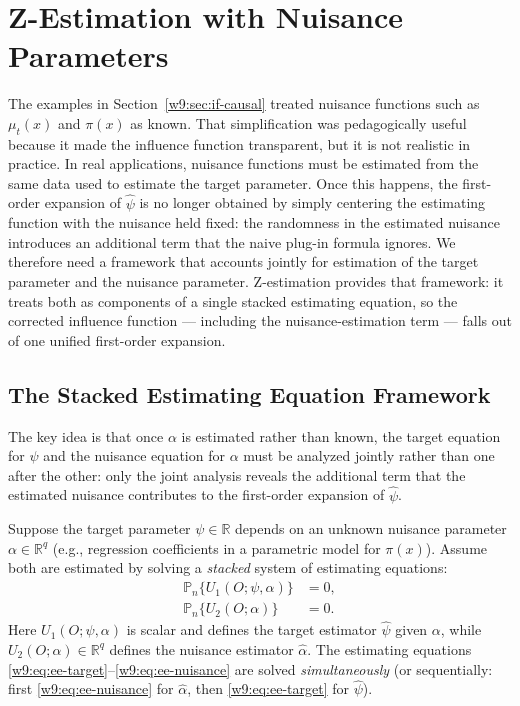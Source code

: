 \documentclass[master.tex]{subfiles}
\begin{document}
\section{Z-Estimation with Nuisance Parameters}
\label{w9:sec:nuisance}

The examples in Section~\ref{w9:sec:if-causal} treated nuisance
functions such as $\mu_t(x)$ and $\pi(x)$ as known.  That
simplification was pedagogically useful because it made the influence
function transparent, but it is not realistic in practice.  In real
applications, nuisance functions must be estimated from the same data
used to estimate the target parameter.  Once this happens, the
first-order expansion of $\hat\psi$ is no longer obtained by simply
centering the estimating function with the nuisance held fixed: the
randomness in the estimated nuisance introduces an additional term that
the naive plug-in formula ignores.  We therefore need a framework that
accounts jointly for estimation of the target parameter and the nuisance
parameter.  Z-estimation provides that framework: it treats both as
components of a single stacked estimating equation, so the corrected
influence function --- including the nuisance-estimation term --- falls
out of one unified first-order expansion.

\subsection{The Stacked Estimating Equation Framework}
\label{w9:subsec:stacked}

The key idea is that once $\alpha$ is estimated rather than known, the
target equation for $\psi$ and the nuisance equation for $\alpha$ must
be analyzed jointly rather than one after the other: only the joint
analysis reveals the additional term that the estimated nuisance
contributes to the first-order expansion of $\hat\psi$.

Suppose the target parameter $\psi \in \mathbb{R}$ depends on an
unknown nuisance parameter $\alpha \in \mathbb{R}^q$ (e.g., regression
coefficients in a parametric model for $\pi(x)$).  Assume both are
estimated by solving a \emph{stacked} system of estimating equations:
\begin{align}
  \mathbb{P}_n\bigl\{U_1(O;\psi,\alpha)\bigr\} &= 0,
  \label{w9:eq:ee-target}\\
  \mathbb{P}_n\bigl\{U_2(O;\alpha)\bigr\} &= 0.
  \label{w9:eq:ee-nuisance}
\end{align}
Here $U_1(O;\psi,\alpha)$ is scalar and defines the target estimator
$\hat\psi$ given $\alpha$, while $U_2(O;\alpha) \in \mathbb{R}^q$
defines the nuisance estimator $\hat\alpha$.  The estimating equations
\eqref{w9:eq:ee-target}--\eqref{w9:eq:ee-nuisance} are solved
\emph{simultaneously} (or sequentially: first \eqref{w9:eq:ee-nuisance}
for $\hat\alpha$, then \eqref{w9:eq:ee-target} for $\hat\psi$).
\end{document}
